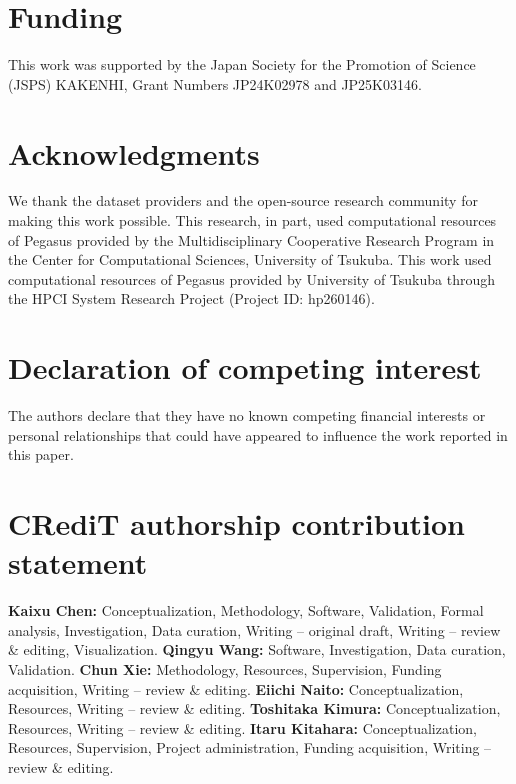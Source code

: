 \documentclass[preprint,12pt]{elsarticle}
\begin{document}
\section*{Funding}
This work was supported by the Japan Society for the Promotion of Science (JSPS) KAKENHI, Grant Numbers JP24K02978 and JP25K03146.

\section*{Acknowledgments}
We thank the dataset providers and the open-source research community for making this work possible. This research, in part, used computational resources of Pegasus provided by the Multidisciplinary Cooperative Research Program in the Center for Computational Sciences, University of Tsukuba. This work used computational resources of Pegasus provided by University of Tsukuba through the HPCI System Research Project (Project ID: hp260146).

\section*{Declaration of competing interest}
The authors declare that they have no known competing financial interests or personal relationships that could have appeared to influence the work reported in this paper.

\section*{CRediT authorship contribution statement}
\textbf{Kaixu Chen:} Conceptualization, Methodology, Software, Validation, Formal analysis, Investigation, Data curation, Writing -- original draft, Writing -- review \& editing, Visualization.
\textbf{Qingyu Wang:} Software, Investigation, Data curation, Validation.
\textbf{Chun Xie:} Methodology, Resources, Supervision, Funding acquisition, Writing -- review \& editing.
\textbf{Eiichi Naito:} Conceptualization, Resources, Writing -- review \& editing.
\textbf{Toshitaka Kimura:} Conceptualization, Resources, Writing -- review \& editing.
\textbf{Itaru Kitahara:} Conceptualization, Resources, Supervision, Project administration, Funding acquisition, Writing -- review \& editing.
\end{document}
